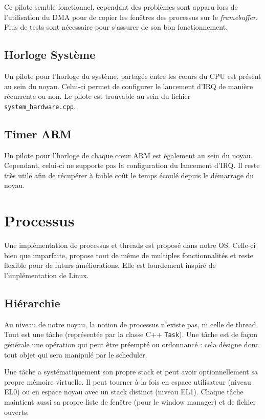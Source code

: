 \documentclass[french, 12pt]{article}
\begin{document}
Ce pilote semble fonctionnel, cependant des problèmes sont apparu lors de
l'utilisation du DMA pour de copier les fenêtres des processus sur le
\textit{framebuffer}. Plus de tests sont nécessaire pour s'assurer de son bon
fonctionnement.

\subsection{Horloge Système}
Un pilote pour l'horloge du système, partagée entre les cœurs du CPU est présent
au sein du noyau. Celui-ci permet de configurer le lancement d'IRQ de manière
récurrente ou non. Le pilote est trouvable au sein du fichier
\texttt{system\_hardware.cpp}.

\subsection{Timer ARM}
Un pilote pour l'horloge de chaque cœur ARM est également au sein du noyau.
Cependant, celui-ci ne supporte pas la configuration du lancement d'IRQ. Il
reste très utile afin de récupérer à faible coût le temps écoulé depuis le
démarrage du noyau.

\section{Processus}

Une implémentation de processus et threads est proposé dans notre OS. Celle-ci bien que imparfaite, propose tout de même de multiples fonctionnalités et reste flexible pour de futurs améliorations. Elle est lourdement inspiré de l'implémentation de Linux.

\subsection{Hiérarchie}

Au niveau de notre noyau, la notion de processus n'existe pas, ni celle de thread. Tout est une tâche (représentée par la classe C++ \texttt{Task}). Une tâche est de façon générale une opération qui peut être préempté ou ordonnancé : cela désigne donc tout objet qui sera manipulé par le scheduler.

Une tâche a systématiquement son propre stack et peut avoir optionnellement sa propre mémoire virtuelle. Il peut tourner à la fois en espace utilisateur (niveau EL0) ou en espace noyau avec un stack distinct (niveau EL1). Chaque tâche maintient aussi sa propre liste de fenêtre (pour le window manager) et de fichier ouverts.
\end{document}
